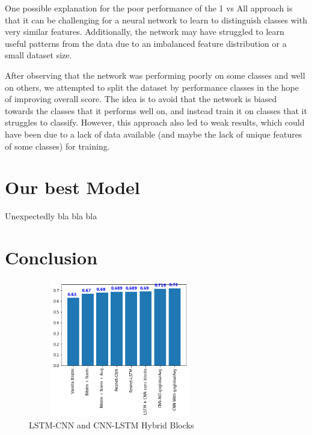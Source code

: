 \documentclass[11pt]{article}
\begin{document}
One possible explanation for the poor performance of the 1 vs All approach is that it can be challenging for a neural network to learn to distinguish
classes with very similar features.
Additionally, the network may have struggled to learn useful patterns from the data due to an imbalanced feature distribution or a small dataset size.

After observing that the network was performing poorly on some classes and well on others, we attempted to split the dataset by performance classes in the hope of improving overall score.
The idea is to avoid that the network is biased towards the classes that it performs well on, and instead train it on classes that it struggles to classify.
However, this approach also led to weak results, which could have been due to a lack of data available (and maybe the lack of unique features of some classes) for training.

\section{Our best Model}
Unexpectedly bla bla bla





\section{Conclusion}

\begin{figure}[h]
  \centering
  \includegraphics[width=8cm, height=6cm]{chart}
  \caption{LSTM-CNN and CNN-LSTM Hybrid Blocks}
\end{figure}


\end{document}
